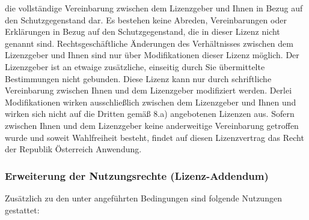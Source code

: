 \begin{description}
  die vollständige Vereinbarung zwischen dem Lizenzgeber
  und Ihnen in Bezug auf den Schutzgegenstand dar. Es
  bestehen keine Abreden, Vereinbarungen oder Erklärungen
  in Bezug auf den Schutzgegenstand, die in dieser Lizenz
  nicht genannt sind. Rechtsgeschäftliche Änderungen des
  Verhältnisses zwischen dem Lizenzgeber und Ihnen sind
  nur über Modifikationen dieser Lizenz möglich. Der
  Lizenzgeber ist an etwaige zusätzliche, einseitig durch
  Sie übermittelte Bestimmungen nicht gebunden. Diese
  Lizenz kann nur durch schriftliche Vereinbarung zwischen
  Ihnen und dem Lizenzgeber modifiziert werden. Derlei
  Modifikationen wirken ausschließlich zwischen dem
  Lizenzgeber und Ihnen und wirken sich nicht auf die
  Dritten gemäß 8.a) angebotenen Lizenzen aus.
  Sofern zwischen Ihnen und dem Lizenzgeber keine
  anderweitige Vereinbarung getroffen wurde und soweit
  Wahlfreiheit besteht, findet auf diesen Lizenzvertrag
  das Recht der Republik Österreich Anwendung.
\end{description}

\clearpage%

\subsubsection{Erweiterung der Nutzungsrechte
(Lizenz-Addendum)}
\label{topic:lizenz-addendum}

Zusätzlich zu den unter  angeführten
Bedingungen sind folgende Nutzungen gestattet:

